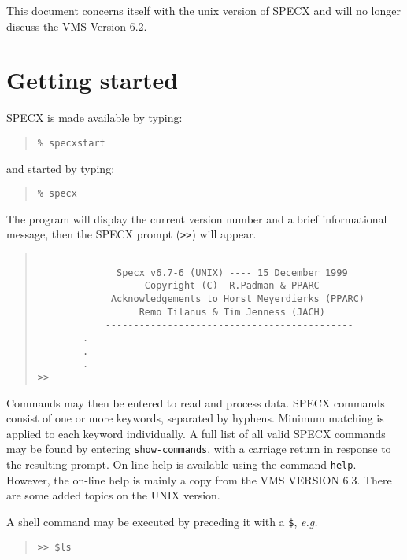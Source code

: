 \documentclass[twoside,11pt]{article}
\renewcommand{\_}{\texttt{\symbol{95}}}
\newenvironment{myquote}{\begin{quote}\begin{small}}{\end{small}\end{quote}}
\begin{document}
This document concerns itself with the unix version of SPECX and will
no longer discuss the VMS Version 6.2.

\section {Getting started}

SPECX is made available by typing:
\begin{myquote}
\begin{verbatim}
% specxstart
\end{verbatim}
\end{myquote}
and started by typing:
\begin{myquote}
\begin{verbatim}
% specx
\end{verbatim}
\end{myquote}
The program will display the current version number and
a brief informational message, then the SPECX prompt ({\tt>>}) will appear.

\begin{myquote}
\begin{verbatim}
            --------------------------------------------
              Specx v6.7-6 (UNIX) ---- 15 December 1999
                   Copyright (C)  R.Padman & PPARC
             Acknowledgements to Horst Meyerdierks (PPARC)
                  Remo Tilanus & Tim Jenness (JACH)
            --------------------------------------------
        .
        .
        .
>>
\end{verbatim}
\end{myquote}

Commands may then be entered to read and process data.
SPECX commands consist of one or more keywords, separated
by hyphens. Minimum matching is applied to each keyword
individually. A full list of all valid SPECX commands
may be found by entering {\tt show-commands}, with a carriage return
in response to the resulting prompt. On-line help is available
using the command {\tt help}. However, the on-line help is mainly a copy
from the VMS VERSION 6.3. There are some added topics on the UNIX version.

A shell command may be executed by preceding it with a {\tt \$}, {\em e.g.}

\begin{myquote}
\begin{verbatim}
>> $ls
\end{verbatim}
\end{myquote}
\end{document}
